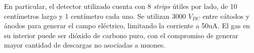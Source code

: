 	En particular, el detector utilizado cuenta con 8 \textit{strips} útiles por lado, de 10 centímetros largo y 1 centímetro cada uno. Se utilizan 3000 $V_{DC}$ entre cátodos y ánodos para generar el campo eléctrico, limitando la corriente a 50uA. El gas en su interior puede ser dióxido de carbono puro, con el compromiso de generar mayor cantidad de descargas no asociadas a muones.

